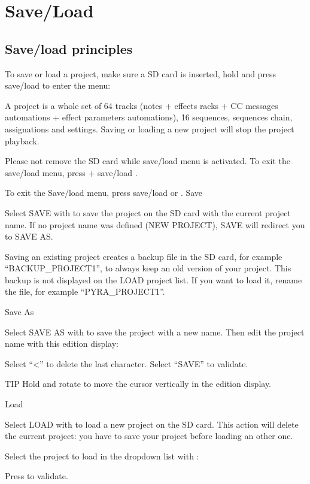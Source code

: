 \chapter{Save/Load}

\section{Save/load principles}

To save or load a project, make sure a SD card is inserted, hold  and press  save/load  to enter the menu:



A project is a whole set of 64 tracks (notes + effects racks + CC messages automations + effect parameters automations), 16 sequences, sequences chain, assignations and settings. Saving or loading a new project will stop the project playback.

Please not remove the SD card while save/load menu is activated. To exit the save/load menu, press  +  save/load .


To exit the Save/load menu, press  save/load  or .
Save

Select SAVE with  to save the project on the SD card with the current project name. If no project name was defined (NEW PROJECT), SAVE will redirect you to SAVE AS.

Saving an existing project creates a backup file in the SD card, for example “BACKUP_PROJECT1”, to always keep an old version of your project. This backup is not displayed on the LOAD project list. If you want to load it, rename the file, for example ``PYRA_PROJECT1''.

Save As

Select SAVE AS with  to save the project with a new name. Then edit the project name with this edition display:



Select ``<'' to delete the last character.
Select ``SAVE'' to validate.

 TIP  Hold  and rotate  to move the cursor vertically in the edition display.

Load

Select LOAD with  to load a new project on the SD card. This action will delete the current project: you have to save your project before loading an other one.

Select the project to load in the dropdown list with :


Press  to validate.

